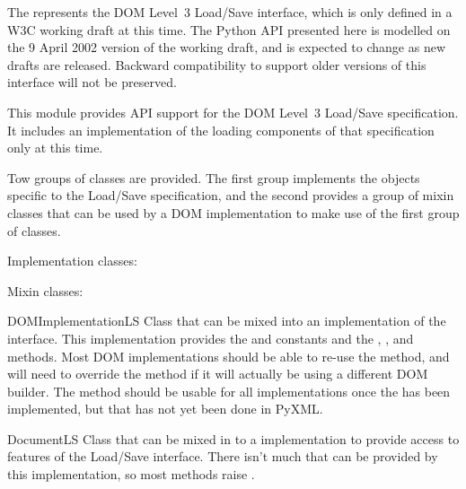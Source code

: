 \documentclass{howto}
\begin{document}

\begin{notice}[warning]
  The  represents the DOM Level~3 Load/Save
  interface, which is only defined in a W3C working draft at this
  time.  The Python API presented here is modelled on the 9 April 2002
  version of the working draft, and is expected to change as new
  drafts are released.  Backward compatibility to support older
  versions of this interface will not be preserved.
\end{notice}

This module provides API support for the DOM Level~3 Load/Save
specification.  It includes an implementation of the loading
components of that specification only at this time.

Tow groups of classes are provided.  The first group implements the
objects specific to the Load/Save specification, and the second
provides a group of mixin classes that can be used by a DOM
implementation to make use of the first group of classes.

Implementation classes:


Mixin classes:

\begin{classdesc*}{DOMImplementationLS}
  Class that can be mixed into an implementation of the
   interface.  This implementation provides
  the  and 
  constants and the ,
  , and 
  methods.  Most DOM implementations should be able to re-use the
   method, and will need to override
  the  method if it will actually be using
  a different DOM builder.  The  method
  should be usable for all implementations once the 
  has been implemented, but that has not yet been done in PyXML.
\end{classdesc*}

\begin{classdesc*}{DocumentLS}
  Class that can be mixed in to a  implementation to
  provide access to features of the Load/Save interface.  There isn't
  much that can be provided by this implementation, so most methods
  raise .
\end{classdesc*}
\end{document}
